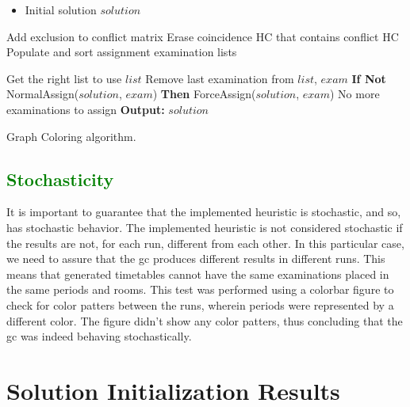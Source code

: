 
\begin{algorithm}
\begin{itemize}
\item Initial solution $solution$
\end{itemize}

\begin{algorithmic}[1]
\State Add exclusion to conflict matrix
\State Erase coincidence HC that contains conflict HC
\State Populate and sort assignment examination lists

\Repeat
	\State Get the right list to use $list$
	\State Remove last examination from $list$, $exam$
	\State \textbf{If Not} NormalAssign($solution$, $exam$) \textbf{Then} ForceAssign($solution$, $exam$)
\Until No more examinations to assign
\State  \textbf{Output:} $solution$
\end{algorithmic}
\caption{Graph Coloring algorithm.}
\label{alg:GraphColoring}
\end{algorithm}

\subsection{\textcolor{green}{Stochasticity}}

It is important to guarantee that the implemented heuristic is stochastic, and so, has stochastic behavior. The implemented heuristic is not considered stochastic if the results are not, for each run, different from each other. In this particular case, we need to assure that the \gls{gc} produces different results in different runs. This means that generated timetables cannot have the same examinations placed in the same periods and rooms. This test was performed using a colorbar figure to check for color patters between the runs, wherein periods were represented by a different color. The figure didn't show any color patters, thus concluding that the \gls{gc} was indeed behaving stochastically.

\section{Solution Initialization Results}

